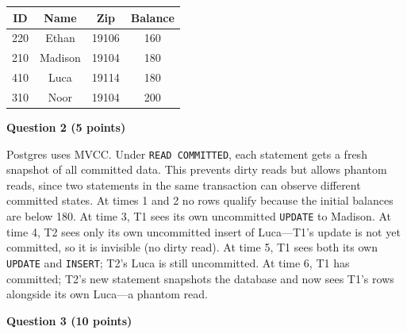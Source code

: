\documentclass[12pt,letterpaper, onecolumn]{exam}
\begin{document}
\begin{questions}
\begin{solution}
\begin{center}
\begin{tabular}{|c|c|c|c|}
\hline
\textbf{ID} & \textbf{Name} & \textbf{Zip} & \textbf{Balance} \\
\hline
220 & Ethan & 19106 & 160\\
210 & Madison & 19104 & 180 \\
410 & Luca & 19114 & 180 \\
310 & Noor & 19104 & 200 \\
\hline
\end{tabular}
\end{center}
  \end{solution}
  \pagebreak
  \question \textbf{Question 2 (5 points)}
  \begin{solution}
     Postgres uses MVCC. Under \texttt{READ COMMITTED}, each statement gets a fresh snapshot of all committed data. This prevents dirty reads but allows phantom reads, since two statements in the same transaction can observe different committed states.
    At times 1 and 2 no rows qualify because the initial balances are below 180. At time 3, T1 sees its own uncommitted \texttt{UPDATE} to Madison. At time 4, T2 sees only its own uncommitted insert of Luca---T1's update is not yet committed, so it is invisible (no dirty read). At time 5, T1 sees both its own \texttt{UPDATE} and \texttt{INSERT}; T2's Luca is still uncommitted. At time 6, T1 has committed; T2's new statement snapshots the database and now sees T1's rows alongside its own Luca---a phantom read.
  \end{solution}
  \question \textbf{Question 3 (10 points)}
  \begin{solution}
\end{solution}
\end{questions}
\end{document}
